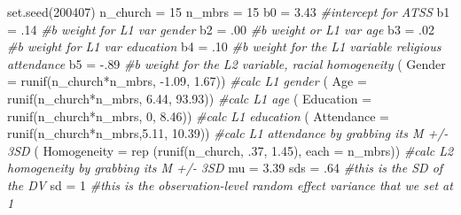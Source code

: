 \documentclass[
  english,
]{book}
\newenvironment{Shaded}{\begin{snugshade}}{\end{snugshade}}
\newcommand{\AttributeTok}[1]{\textcolor[rgb]{0.77,0.63,0.00}{#1}}
\newcommand{\CommentTok}[1]{\textcolor[rgb]{0.56,0.35,0.01}{\textit{#1}}}
\newcommand{\DecValTok}[1]{\textcolor[rgb]{0.00,0.00,0.81}{#1}}
\newcommand{\FloatTok}[1]{\textcolor[rgb]{0.00,0.00,0.81}{#1}}
\newcommand{\FunctionTok}[1]{\textcolor[rgb]{0.00,0.00,0.00}{#1}}
\newcommand{\NormalTok}[1]{#1}
\newcommand{\OtherTok}[1]{\textcolor[rgb]{0.56,0.35,0.01}{#1}}
\newcommand{\SpecialCharTok}[1]{\textcolor[rgb]{0.00,0.00,0.00}{#1}}
\begin{document}
\begin{Shaded}
\begin{Highlighting}[]
\FunctionTok{set.seed}\NormalTok{(}\DecValTok{200407}\NormalTok{)}
\NormalTok{n\_church }\OtherTok{=} \DecValTok{15}
\NormalTok{n\_mbrs }\OtherTok{=} \DecValTok{15}
\NormalTok{b0 }\OtherTok{=} \FloatTok{3.43} \CommentTok{\#intercept for ATSS}
\NormalTok{b1 }\OtherTok{=}\NormalTok{ .}\DecValTok{14} \CommentTok{\#b weight for L1 var gender}
\NormalTok{b2 }\OtherTok{=}\NormalTok{ .}\DecValTok{00} \CommentTok{\#b weight or L1 var age}
\NormalTok{b3 }\OtherTok{=}\NormalTok{ .}\DecValTok{02} \CommentTok{\#b weight for L1 var education}
\NormalTok{b4 }\OtherTok{=}\NormalTok{ .}\DecValTok{10} \CommentTok{\#b weight for the L1 variable religious attendance}
\NormalTok{b5 }\OtherTok{=} \SpecialCharTok{{-}}\NormalTok{.}\DecValTok{89} \CommentTok{\#b weight for the L2 variable, racial homogeneity}
\NormalTok{( }\AttributeTok{Gender =} \FunctionTok{runif}\NormalTok{(n\_church}\SpecialCharTok{*}\NormalTok{n\_mbrs, }\SpecialCharTok{{-}}\FloatTok{1.09}\NormalTok{, }\FloatTok{1.67}\NormalTok{)) }\CommentTok{\#calc L1 gender}
\NormalTok{( }\AttributeTok{Age =} \FunctionTok{runif}\NormalTok{(n\_church}\SpecialCharTok{*}\NormalTok{n\_mbrs, }\FloatTok{6.44}\NormalTok{, }\FloatTok{93.93}\NormalTok{)) }\CommentTok{\#calc L1 age}
\NormalTok{( }\AttributeTok{Education =} \FunctionTok{runif}\NormalTok{(n\_church}\SpecialCharTok{*}\NormalTok{n\_mbrs, }\DecValTok{0}\NormalTok{, }\FloatTok{8.46}\NormalTok{)) }\CommentTok{\#calc L1 education}
\NormalTok{( }\AttributeTok{Attendance =} \FunctionTok{runif}\NormalTok{(n\_church}\SpecialCharTok{*}\NormalTok{n\_mbrs,}\FloatTok{5.11}\NormalTok{, }\FloatTok{10.39}\NormalTok{)) }\CommentTok{\#calc L1 attendance by grabbing  its M +/{-} 3SD}
\NormalTok{( }\AttributeTok{Homogeneity =} \FunctionTok{rep}\NormalTok{ (}\FunctionTok{runif}\NormalTok{(n\_church, .}\DecValTok{37}\NormalTok{, }\FloatTok{1.45}\NormalTok{), }\AttributeTok{each =}\NormalTok{ n\_mbrs)) }\CommentTok{\#calc L2 homogeneity by grabbing  its M +/{-} 3SD}
\NormalTok{mu }\OtherTok{=} \FloatTok{3.39} 
\NormalTok{sds }\OtherTok{=}\NormalTok{ .}\DecValTok{64} \CommentTok{\#this is the SD of the DV}
\NormalTok{sd }\OtherTok{=} \DecValTok{1} \CommentTok{\#this is the observation{-}level random effect variance that we set at 1}


\end{Highlighting}
\end{Shaded}
\end{document}
